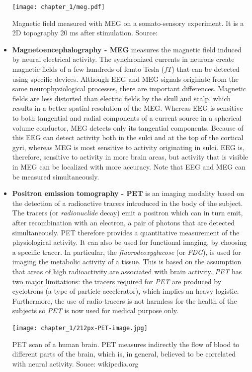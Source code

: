 \begin{itemize}
\begin{marginfigure}[5cm]
\center \texttt{[image: chapter\_1/meg.pdf]}
\caption{Magnetic field measured with MEG on a somato-sensory experiment. It is a 2D topography 20 ms after stimulation. Source: \citep{gramfort:09}}
\end{marginfigure}
\item{\bf{Magnetoencephalography - MEG}}
measures the magnetic field induced by neural electrical activity.
The synchronized currents in neurons create magnetic fields of a
few hundreds of femto Tesla ($fT$) that can be detected using specific devices. 
Although EEG and MEG signals originate from the same neurophysiological processes, there are important differences. Magnetic fields are less distorted than electric fields by the skull and scalp, which results in a better spatial resolution of the MEG. Whereas EEG is sensitive to both tangential and radial components of a current source in a spherical volume conductor, MEG detects only its tangential components. Because of this EEG can detect activity both in the sulci and at the top of the cortical gyri, whereas MEG is most sensitive to activity originating in sulci. EEG is, therefore, sensitive to activity in more brain areas, but activity that is visible in MEG can be localized with more accuracy. Note that EEG and MEG can be measured simultaneously.


\item{\bf{Positron emission tomography - PET}}
 is an imaging modality based on the
detection of a radioactive tracers introduced in the body of the subject. The
tracers (or \emph{radionuclide} decay) emit a positron which can in turn emit,
after recombination with an electron, a pair of photons that are detected
simultaneously. PET therefore provides a quantitative measurement of the physiological activity. It can also be used for functional imaging, by choosing a specific tracer.
In particular, the \emph{fluorodeoxyglucose} (or \emph{FDG}), is used for
imaging the metabolic activity of a tissue. This is based on the assumption that areas of high radioactivity are associated with brain activity.
\emph{PET} has two major limitations: the tracers required for
\emph{PET} are produced by cyclotrons (a type of particle accelerator),
which implies an heavy logistic. Furthermore, the use of radio-tracers is not harmless
for the
health of the subjects so \emph{PET} is now used for medical purpose only.

\begin{marginfigure}[0cm]
\center \texttt{[image: chapter\_1/212px-PET-image.jpg]}
\caption{PET scan of a human brain. 
PET measures indirectly the flow of blood to different parts of the brain, which is, in general, believed to be correlated with neural activity.
Souce: wikipedia.org}
\end{marginfigure}



\end{itemize}

